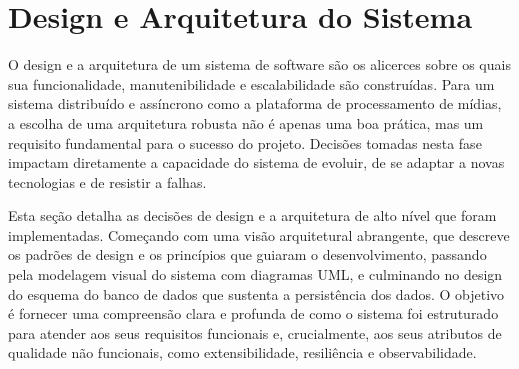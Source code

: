 \section{Design e Arquitetura do Sistema}
\label{sec:design}

O design e a arquitetura de um sistema de software são os alicerces sobre os quais sua funcionalidade, manutenibilidade e escalabilidade são construídas. Para um sistema distribuído e assíncrono como a plataforma de processamento de mídias, a escolha de uma arquitetura robusta não é apenas uma boa prática, mas um requisito fundamental para o sucesso do projeto. Decisões tomadas nesta fase impactam diretamente a capacidade do sistema de evoluir, de se adaptar a novas tecnologias e de resistir a falhas.

Esta seção detalha as decisões de design e a arquitetura de alto nível que foram implementadas. Começando com uma visão arquitetural abrangente, que descreve os padrões de design e os princípios que guiaram o desenvolvimento, passando pela modelagem visual do sistema com diagramas UML, e culminando no design do esquema do banco de dados que sustenta a persistência dos dados. O objetivo é fornecer uma compreensão clara e profunda de como o sistema foi estruturado para atender aos seus requisitos funcionais e, crucialmente, aos seus atributos de qualidade não funcionais, como extensibilidade, resiliência e observabilidade.
